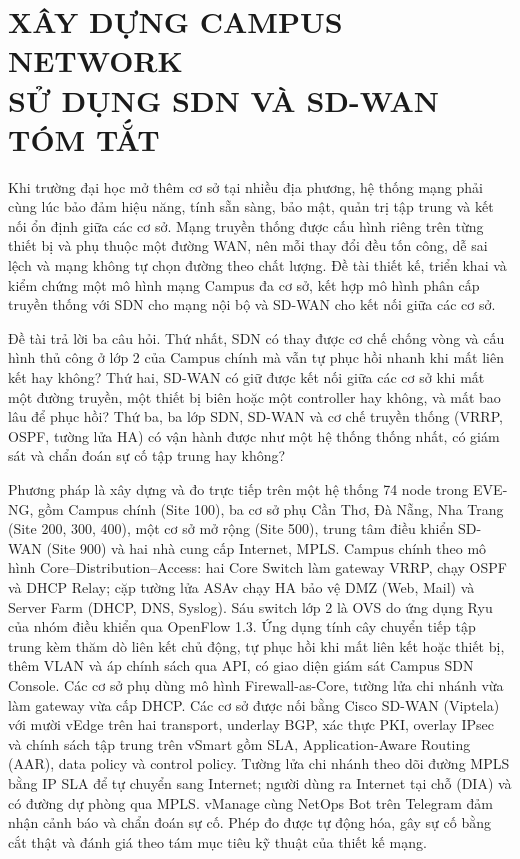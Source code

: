 \section*{XÂY DỰNG CAMPUS NETWORK\\SỬ DỤNG SDN VÀ SD-WAN\\TÓM TẮT}

Khi trường đại học mở thêm cơ sở tại nhiều địa phương, hệ thống mạng phải cùng lúc bảo đảm hiệu năng, tính sẵn sàng, bảo mật, quản trị tập trung và kết nối ổn định giữa các cơ sở. Mạng truyền thống được cấu hình riêng trên từng thiết bị và phụ thuộc một đường WAN, nên mỗi thay đổi đều tốn công, dễ sai lệch và mạng không tự chọn đường theo chất lượng. Đề tài thiết kế, triển khai và kiểm chứng một mô hình mạng Campus đa cơ sở, kết hợp mô hình phân cấp truyền thống với SDN cho mạng nội bộ và SD-WAN cho kết nối giữa các cơ sở.

Đề tài trả lời ba câu hỏi. Thứ nhất, SDN có thay được cơ chế chống vòng và cấu hình thủ công ở lớp 2 của Campus chính mà vẫn tự phục hồi nhanh khi mất liên kết hay không? Thứ hai, SD-WAN có giữ được kết nối giữa các cơ sở khi mất một đường truyền, một thiết bị biên hoặc một controller hay không, và mất bao lâu để phục hồi? Thứ ba, ba lớp SDN, SD-WAN và cơ chế truyền thống (VRRP, OSPF, tường lửa HA) có vận hành được như một hệ thống thống nhất, có giám sát và chẩn đoán sự cố tập trung hay không?

Phương pháp là xây dựng và đo trực tiếp trên một hệ thống 74 node trong EVE-NG, gồm Campus chính (Site 100), ba cơ sở phụ Cần Thơ, Đà Nẵng, Nha Trang (Site 200, 300, 400), một cơ sở mở rộng (Site 500), trung tâm điều khiển SD-WAN (Site 900) và hai nhà cung cấp Internet, MPLS. Campus chính theo mô hình Core--Distribution--Access: hai Core Switch làm gateway VRRP, chạy OSPF và DHCP Relay; cặp tường lửa ASAv chạy HA bảo vệ DMZ (Web, Mail) và Server Farm (DHCP, DNS, Syslog). Sáu switch lớp 2 là OVS do ứng dụng Ryu của nhóm điều khiển qua OpenFlow 1.3. Ứng dụng tính cây chuyển tiếp tập trung kèm thăm dò liên kết chủ động, tự phục hồi khi mất liên kết hoặc thiết bị, thêm VLAN và áp chính sách qua API, có giao diện giám sát Campus SDN Console. Các cơ sở phụ dùng mô hình Firewall-as-Core, tường lửa chi nhánh vừa làm gateway vừa cấp DHCP. Các cơ sở được nối bằng Cisco SD-WAN (Viptela) với mười vEdge trên hai transport, underlay BGP, xác thực PKI, overlay IPsec và chính sách tập trung trên vSmart gồm SLA, Application-Aware Routing (AAR), data policy và control policy. Tường lửa chi nhánh theo dõi đường MPLS bằng IP SLA để tự chuyển sang Internet; người dùng ra Internet tại chỗ (DIA) và có đường dự phòng qua MPLS. vManage cùng NetOps Bot trên Telegram đảm nhận cảnh báo và chẩn đoán sự cố. Phép đo được tự động hóa, gây sự cố bằng cắt thật và đánh giá theo tám mục tiêu kỹ thuật của thiết kế mạng.

